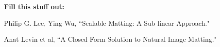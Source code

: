 \textbf{Fill this stuff out:}

\begin{thebibliography}{9}
	Philip G. Lee, Ying Wu,
	``Scalable Matting: A Sub-linear Approach."
	
	Anat Levin et al,
	``A Closed Form Solution to Natural Image Matting."
	

\end{thebibliography}